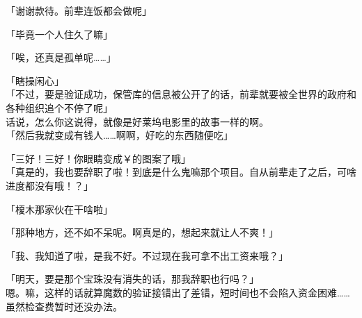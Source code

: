 「谢谢款待。前辈连饭都会做呢」

「毕竟一个人住久了嘛」

「唉，还真是孤单呢……」

「瞎操闲心」\\

「不过，要是验证成功，保管库的信息被公开了的话，前辈就要被全世界的政府和各种组织追个不停了呢」\\

话说，怎么你这说得，就像是好莱坞电影里的故事一样的啊。\\

「然后我就变成有钱人……啊啊，好吃的东西随便吃」

「三好！三好！你眼睛变成￥的图案了哦」\\

「真是的，我也要辞职了啦！到底是什么鬼嘛那个项目。自从前辈走了之后，可啥进度都没有哦！？」

「榎木那家伙在干啥啦」

「那种地方，还不如不呆呢。啊真是的，想起来就让人不爽！」

「我、我知道了啦，是我不好。不过现在我可拿不出工资来哦？」

「明天，要是那个宝珠没有消失的话，那我辞职也行吗？」\\

嗯。嘛，这样的话就算魔数的验证接错出了差错，短时间也不会陷入资金困难……虽然检查费暂时还没办法。\\

